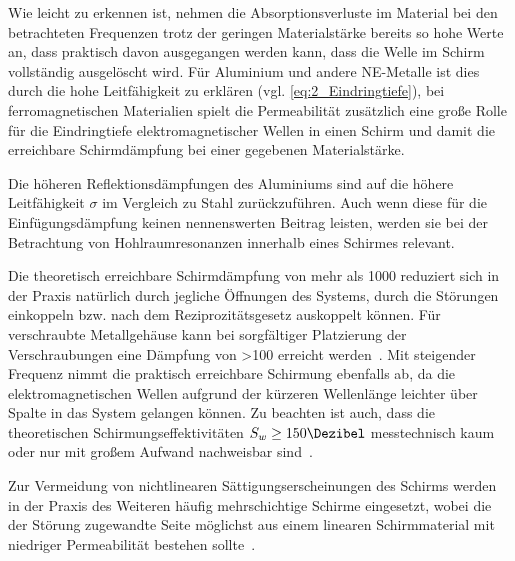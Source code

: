Wie leicht zu erkennen ist, nehmen die Absorptionsverluste im Material bei den betrachteten Frequenzen trotz der geringen Materialstärke bereits so hohe Werte an, dass praktisch davon ausgegangen werden kann, dass die Welle im Schirm vollständig ausgelöscht wird. Für Aluminium und andere \ac{NE-Metalle} ist dies durch die hohe Leitfähigkeit zu erklären (vgl. \Gleichung\eqref{eq:2_Eindringtiefe}), bei ferromagnetischen Materialien spielt die Permeabilität zusätzlich eine große Rolle für die Eindringtiefe elektromagnetischer Wellen in einen Schirm und damit die erreichbare Schirmdämpfung bei einer gegebenen Materialstärke. 
\par 
\vspace{\linespace}
Die höheren Reflektionsdämpfungen des Aluminiums sind auf die höhere Leitfähigkeit $\sigma$ im Vergleich zu Stahl zurückzuführen. Auch wenn diese für die Einfügungsdämpfung keinen nennenswerten Beitrag leisten, werden sie bei der Betrachtung von Hohlraumresonanzen innerhalb eines Schirmes relevant. 
\par
\vspace{\linespace}
Die theoretisch erreichbare Schirmdämpfung von mehr als \SI{1000}{\Dezibel} reduziert sich in der Praxis natürlich durch jegliche Öffnungen des Systems, durch die Störungen einkoppeln bzw. nach dem Reziprozitätsgesetz auskoppelt können. Für verschraubte Metallgehäuse kann bei sorgfältiger Platzierung der Verschraubungen eine Dämpfung von >\SI{100}{\Dezibel} erreicht werden~\cite{Design_of_shielded_enclosures}. Mit steigender Frequenz nimmt die praktisch erreichbare Schirmung ebenfalls ab, da die elektromagnetischen Wellen aufgrund der kürzeren Wellenlänge leichter über Spalte in das System gelangen können. Zu beachten ist auch, dass die theoretischen Schirmungseffektivitäten $S_w \geq 150 \si{\Dezibel}$ messtechnisch kaum oder nur mit großem Aufwand nachweisbar sind~\cite{EM_Schirmung}.
\par
\vspace{\linespace}
Zur Vermeidung von nichtlinearen Sättigungserscheinungen des Schirms werden in der Praxis des Weiteren häufig mehrschichtige Schirme eingesetzt, wobei die der Störung zugewandte Seite möglichst aus einem linearen Schirmmaterial mit niedriger Permeabilität bestehen sollte~\cite{EMV}. 



